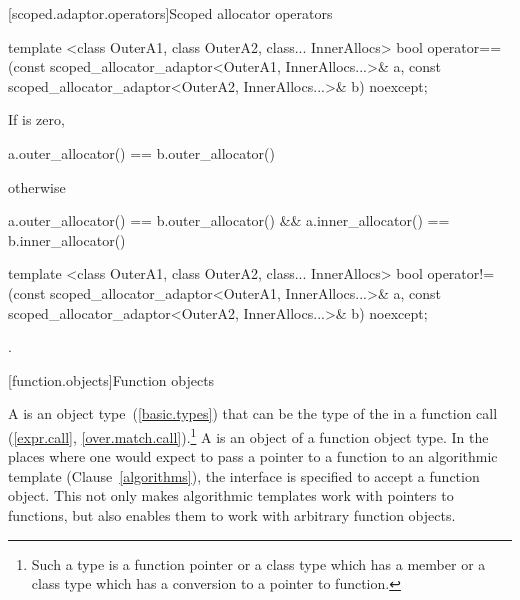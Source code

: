 [scoped.adaptor.operators]{Scoped allocator operators}

%
\begin{itemdecl}
template <class OuterA1, class OuterA2, class... InnerAllocs>
  bool operator==(const scoped_allocator_adaptor<OuterA1, InnerAllocs...>& a,
                  const scoped_allocator_adaptor<OuterA2, InnerAllocs...>& b) noexcept;
\end{itemdecl}

\begin{itemdescr}
\pnum
\returns If  is zero,
\begin{codeblock}
a.outer_allocator() == b.outer_allocator()
\end{codeblock}
otherwise
\begin{codeblock}
a.outer_allocator() == b.outer_allocator() && a.inner_allocator() == b.inner_allocator()
\end{codeblock}
\end{itemdescr}

%
\begin{itemdecl}
template <class OuterA1, class OuterA2, class... InnerAllocs>
  bool operator!=(const scoped_allocator_adaptor<OuterA1, InnerAllocs...>& a,
                  const scoped_allocator_adaptor<OuterA2, InnerAllocs...>& b) noexcept;
\end{itemdecl}

\begin{itemdescr}
\pnum
\returns {}.
\end{itemdescr}

[function.objects]{Function objects}

\pnum
A  is an object
type~(\ref{basic.types}) that can be the type of the
 in a function call
(\ref{expr.call}, \ref{over.match.call}).\footnote{Such a type is a function
pointer or a class type which has a member  or a class type
which has a conversion to a pointer to function.} A  is an
object of a function object type. In the places where one would expect to pass a
pointer to a function to an algorithmic template (Clause~\ref{algorithms}), the
interface is specified to accept a function object. This not only makes
algorithmic templates work with pointers to functions, but also enables them to
work with arbitrary function objects.


